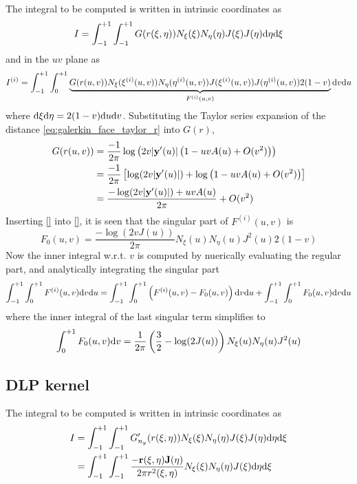The integral to be computed is written in intrinsic coordinates as
%
\begin{equation}
	I = \int_{-1}^{+1}
	\int_{-1}^{+1}
	G(r(\xi,\eta)) 
	N_{\xi}(\xi) N_{\eta}(\eta) 
	J(\xi) J(\eta)
	\mathrm{d} \eta
	\mathrm{d} \xi
\end{equation}
%
and in the $uv$ plane as
%
\begin{equation}
	I^{(i)} = \int_{-1}^{+1}
	\int_{0}^{+1}
	\underbrace{G(r(u,v)) N_{\xi}(\xi^{(i)}(u,v)) N_{\eta}(\eta^{(i)}(u,v)) 
	J(\xi^{(i)}(u,v)) J(\eta^{(i)}(u,v)) 2(1-v)}_{F^{(i)}(u,v)}
	\mathrm{d} v
	\mathrm{d} u
\end{equation}
%
where $\mathrm{d}\xi \mathrm{d}\eta = 2(1-v) \mathrm{d} u \mathrm{d} v$.
Substituting the Taylor series expansion of the distance \eqref{eq:galerkin_face_taylor_r} into $G(r)$, 
%
\begin{align}
	G(r(u,v)) 
	&= \frac{-1}{2\pi} \log\left(2v|{\bf y}'(u)| \left(1 - u v A(u) + O(v^2) \right)\right) \\
	&= \frac{-1}{2\pi} \left[ 
	\log(2v|{\bf y}'(u)| )
	+
	\log \left(1 - u v A(u) + O(v^2) \right)
	\right] \\
	&= \frac{-\log(2v|{\bf y}'(u)| )
	+
	u v A(u)
	}{2\pi} 
	 + O(v^2)
\end{align}
%
Inserting \eqref{} into \eqref{}, it is seen that the singular part of $F^{(i)}(u,v)$ is
%
\begin{equation}
	F_0(u,v) = \frac{-\log(2v J(u) )}{2\pi} 
	N_{\xi}(u) N_{\eta}(u) 
	J^2(u) 2(1-v)
\end{equation}
%
Now the inner integral w.r.t. $v$ is computed by nuerically evaluating the regular part, and analytically integrating the singular part
%
\begin{equation}
	\int_{-1}^{+1} \int_{0}^{+1} F^{(i)}(u,v) \mathrm{d} v \mathrm{d} u
	= 
	\int_{-1}^{+1} \int_{0}^{+1} \left( F^{(i)}(u,v) - F_0(u,v) \right) \mathrm{d} v \mathrm{d} u
	+
	\int_{-1}^{+1} \int_{0}^{+1} F_0(u,v) \mathrm{d} v \mathrm{d} u
\end{equation}
%
where the inner integral of the last singular term simplifies to
%
\begin{equation}
	\int_{0}^{+1} F_0(u,v) \mathrm{d} v = \frac{1}{2\pi} \left(\frac{3}{2} - \log(2 J(u)) \right) N_{\xi}(u) N_{\eta}(u) 
	J^2(u)
\end{equation}

\subsection{DLP kernel}

The integral to be computed is written in intrinsic coordinates as
%
\begin{align}
	I 
	&= \int_{-1}^{+1}
	\int_{-1}^{+1}
	G'_{n_y}(r(\xi,\eta)) 
	N_{\xi}(\xi) N_{\eta}(\eta)
	J(\xi) J(\eta)
	\mathrm{d} \eta
	\mathrm{d} \xi \\
	&= \int_{-1}^{+1}
	\int_{-1}^{+1}
	\frac{-{\bf r}(\xi,\eta) {\bf J}(\eta)}{2\pi r^2(\xi,\eta)}
	N_{\xi}(\xi) N_{\eta}(\eta)
	J(\xi)
	\mathrm{d} \eta
	\mathrm{d} \xi
\end{align}

